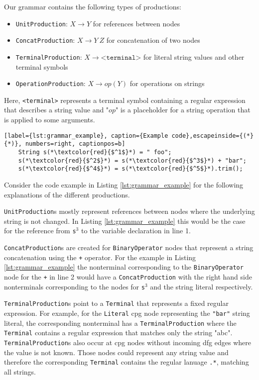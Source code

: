 Our grammar contains the following types of productions:
\begin{itemize}
	\item \lstinline|UnitProduction|:  $X \rightarrow Y$ for references between nodes
	\item \lstinline|ConcatProduction|: $X \rightarrow Y\ Z$ for concatenation of two nodes
	\item \lstinline|TerminalProduction|: $X \rightarrow \texttt{<terminal>}$ for literal string values and other terminal symbols
	\item \lstinline|OperationProduction|: $X \rightarrow op(Y)$ for operations on strings
\end{itemize}

Here, \texttt{<terminal>} represents a terminal symbol containing a regular expression that describes a string value and "$op$" is a placeholder for a string operation that is applied to some arguments.

\begin{lstlisting}[label={lst:grammar_example}, caption={Example code},escapeinside={(*}{*)}, numbers=right, captionpos=b]
	String s(*\textcolor{red}{$^1$}*) = " foo";
	s(*\textcolor{red}{$^2$}*) = s(*\textcolor{red}{$^3$}*) + "bar";
	s(*\textcolor{red}{$^4$}*) = s(*\textcolor{red}{$^5$}*).trim();
\end{lstlisting}

Consider the code example in Listing \ref{lst:grammar_example} for the following explanations of the different productions.

\lstinline|UnitProduction|s mostly represent references between nodes where the underlying string is not changed. In Listing \ref{lst:grammar_example} this would be the case for the reference from \lstinline|s|$^3$ to the variable declaration in line 1. 

\lstinline|ConcatProduction|s are created for \lstinline|BinaryOperator| nodes that represent a string concatenation using the \lstinline|+| operator. For the example in Listing \ref{lst:grammar_example} the nonterminal corresponding to the \lstinline|BinaryOperator| node for the \lstinline|+| in line 2 would have a \lstinline|ConcatProduction| with the right hand side nonterminals corresponding to the nodes for \lstinline|s|$^3$ and the string literal respectively.

\lstinline|TerminalProduction|s point to a \lstinline|Terminal| that represents a fixed regular expression.
For example, for the \lstinline|Literal| \ac{cpg} node representing the \lstinline|"bar"| string literal, the corresponding nonterminal has a \lstinline|TerminalProduction| where the \lstinline|Terminal| contains a regular expression that matches only the string "abc". \lstinline|TerminalProduction|s also occur at \ac{cpg} nodes without incoming \ac{dfg} edges where the value is not known. Those nodes could represent any string value and therefore the corresponding \lstinline|Terminal| contains the regular lanuage \lstinline|.*|, matching all strings.

